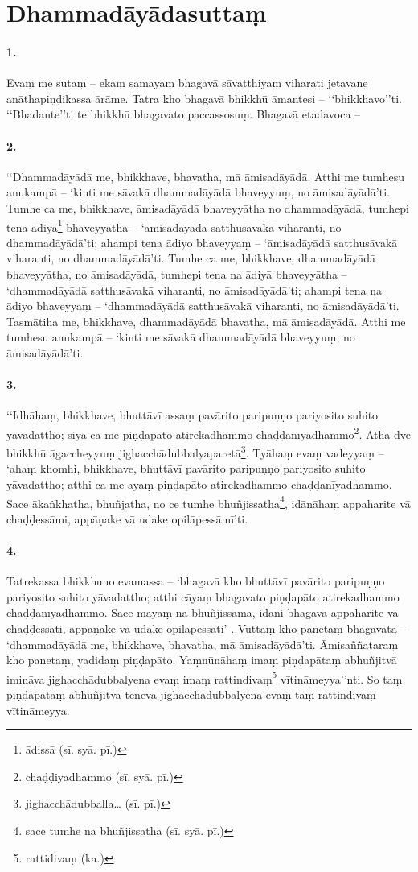 \section{Dhammadāyādasuttaṃ}

\paragraph{1.} Evaṃ me sutaṃ – ekaṃ samayaṃ bhagavā sāvatthiyaṃ viharati jetavane anāthapiṇḍikassa ārāme. Tatra kho bhagavā bhikkhū āmantesi – ‘‘bhikkhavo’’ti. ‘‘Bhadante’’ti te bhikkhū bhagavato paccassosuṃ. Bhagavā etadavoca –

\paragraph{2.} ‘‘Dhammadāyādā me, bhikkhave, bhavatha, mā āmisadāyādā. Atthi me tumhesu anukampā – ‘kinti me sāvakā dhammadāyādā bhaveyyuṃ, no āmisadāyādā’ti. Tumhe ca me, bhikkhave, āmisadāyādā bhaveyyātha no dhammadāyādā, tumhepi tena ādiyā\footnote{ādissā (sī. syā. pī.)} bhaveyyātha – ‘āmisadāyādā satthusāvakā viharanti, no dhammadāyādā’ti; ahampi tena ādiyo bhaveyyaṃ – ‘āmisadāyādā satthusāvakā viharanti, no dhammadāyādā’ti. Tumhe ca me, bhikkhave, dhammadāyādā bhaveyyātha, no āmisadāyādā, tumhepi tena na ādiyā bhaveyyātha – ‘dhammadāyādā satthusāvakā viharanti, no āmisadāyādā’ti; ahampi tena na ādiyo bhaveyyaṃ – ‘dhammadāyādā satthusāvakā viharanti, no āmisadāyādā’ti. Tasmātiha me, bhikkhave, dhammadāyādā bhavatha, mā āmisadāyādā. Atthi me tumhesu anukampā – ‘kinti me sāvakā dhammadāyādā bhaveyyuṃ, no āmisadāyādā’ti.

\paragraph{3.} ‘‘Idhāhaṃ, bhikkhave, bhuttāvī assaṃ pavārito paripuṇṇo pariyosito suhito yāvadattho; siyā ca me piṇḍapāto atirekadhammo chaḍḍanīyadhammo\footnote{chaḍḍiyadhammo (sī. syā. pī.)}. Atha dve bhikkhū āgaccheyyuṃ jighacchādubbalyaparetā\footnote{jighacchādubballa… (sī. pī.)}. Tyāhaṃ evaṃ vadeyyaṃ – ‘ahaṃ khomhi, bhikkhave, bhuttāvī pavārito paripuṇṇo pariyosito suhito yāvadattho; atthi ca me ayaṃ piṇḍapāto atirekadhammo chaḍḍanīyadhammo. Sace ākaṅkhatha, bhuñjatha, no ce tumhe bhuñjissatha\footnote{sace tumhe na bhuñjissatha (sī. syā. pī.)}, idānāhaṃ appaharite vā chaḍḍessāmi, appāṇake vā udake opilāpessāmī’ti.

\paragraph{4.} Tatrekassa bhikkhuno evamassa – ‘bhagavā kho bhuttāvī pavārito paripuṇṇo pariyosito suhito yāvadattho; atthi cāyaṃ bhagavato piṇḍapāto atirekadhammo chaḍḍanīyadhammo. Sace mayaṃ na bhuñjissāma, idāni bhagavā appaharite vā chaḍḍessati, appāṇake vā udake opilāpessati’ . Vuttaṃ kho panetaṃ bhagavatā – ‘dhammadāyādā me, bhikkhave, bhavatha, mā āmisadāyādā’ti. Āmisaññataraṃ kho panetaṃ, yadidaṃ piṇḍapāto. Yaṃnūnāhaṃ imaṃ piṇḍapātaṃ abhuñjitvā imināva jighacchādubbalyena evaṃ imaṃ rattindivaṃ\footnote{rattidivaṃ (ka.)} vītināmeyya’’nti. So taṃ piṇḍapātaṃ abhuñjitvā teneva jighacchādubbalyena evaṃ taṃ rattindivaṃ vītināmeyya.

